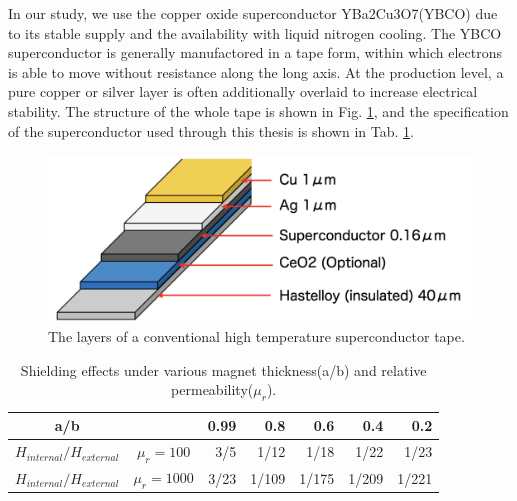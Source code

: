 In our study, we use the copper oxide superconductor YBa2Cu3O7(YBCO) due to its stable supply and the availability with liquid nitrogen cooling.
The YBCO superconductor is generally manufactored in a tape form, within which electrons is able to move without resistance along the long axis.
At the production level, a pure copper or silver layer is often additionally overlaid to increase electrical stability.
The structure of the whole tape is shown in Fig. \ref{fig:Y},
and the specification of the superconductor used through this thesis is shown in Tab. \ref{tab:Y}.
\begin{figure}[H]
  \includegraphics[width=18.5cm, bb=9 9 900 360]{./section2Proposal/Y.png}
  \caption{The layers of a conventional high temperature superconductor tape.}
  \label{fig:Y}
\end{figure}
\begin{table}[H]
  \centering
  \caption{Shielding effects under various magnet thickness(a/b) and relative permeability($\mu_r$).}
  \label{tab:Y}
  \begin{tabular}{cc|rrrrr}\hline\hline
    a/b &  & 0.99 & 0.8 & 0.6 & 0.4 & 0.2\\\hline
    $H_{internal}/H_{external}$ & $\mu_r = 100$ & 3/5 & 1/12 & 1/18 & 1/22 & 1/23 \\
    $H_{internal}/H_{external}$ & $\mu_r = 1000$ & 3/23 & 1/109 & 1/175 & 1/209 & 1/221 \\\hline\hline
  \end{tabular}
\end{table}

